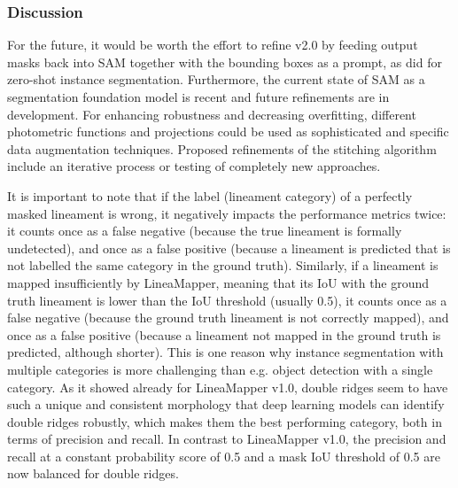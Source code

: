 \subsubsection{Discussion}\label{sec:discussing_lineaMapperv1.1}
For the future, it would be worth the effort to refine v2.0 by feeding output masks back into SAM together with the bounding boxes as a prompt, as did for zero-shot instance segmentation. Furthermore, the current state of SAM as a segmentation foundation model is recent and future refinements are in development.
For enhancing robustness and decreasing overfitting, different photometric functions and projections could be used as sophisticated and specific data augmentation techniques. Proposed refinements of the stitching algorithm include an iterative process or testing of completely new approaches. 

It is important to note that if the label (lineament category) of a perfectly masked lineament is wrong, it negatively impacts the performance metrics twice: it counts once as a false negative (because the true lineament is formally undetected), and once as a false positive (because a lineament is predicted that is not labelled the same category in the ground truth). Similarly, if a lineament is mapped insufficiently by LineaMapper, meaning that its IoU with the ground truth lineament is lower than the IoU threshold (usually 0.5), it counts once as a false negative (because the ground truth lineament is not correctly mapped), and once as a false positive (because a lineament not mapped in the ground truth is predicted, although shorter). This is one reason why instance segmentation with multiple categories is more challenging than e.g. object detection with a single category. 
As it showed already for LineaMapper v1.0, double ridges seem to have such a unique and consistent morphology that deep learning models can identify double ridges robustly, which makes them the best performing category, both in terms of precision and recall. In contrast to LineaMapper v1.0, the precision and recall at a constant probability score of 0.5 and a mask IoU threshold of 0.5 are now balanced for double ridges. 

